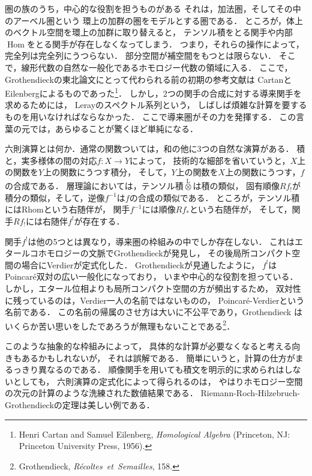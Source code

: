 \documentclass[11pt, a4paper, dvipdfmx]{jlreq}
\theoremstyle{definition}
\newcommand{\Hom}{\mathop{\mathrm{Hom}}\nolimits}
\theoremstyle{mystyle}
\numberwithin{equation}{section} %
\begin{document}
圏の族のうち，中心的な役割を担うものがある
それは，加法圏，そしてその中のアーベル圏という
環上の加群の圏をモデルとする圏である．
ところが，体上のベクトル空間を環上の加群に取り替えると，
テンソル積をとる関手や内部$\Hom$をとる関手が存在しなくなってしまう．
つまり，それらの操作によって，完全列は完全列にうつらない．
部分空間が補空間をもつとは限らない．
そこで，線形代数の自然な一般化であるホモロジー代数の領域に入る．
ここで，Grothendieckの東北論文にとって代わられる前の初期の参考文献は
CartanとEilenbergによるものであった\footnote[10]{
    Henri Cartan and Samuel Eilenberg, 
    \textit{Homological Algebra} 
    (Princeton, NJ: Princeton University Press, 1956).
}．
しかし，2つの関手の合成に対する導来関手を求めるためには，
Lerayのスペクトル系列という，
しばしば煩雑な計算を要するものを用いなければならなかった．
ここで導来圏がその力を発揮する．
この言葉の元では，あらゆることが驚くほど単純になる．

六則演算とは何か．通常の関数ついては，和の他に3つの自然な演算がある．
積と，実多様体の間の対応$f\colon X\to Y$によって，
技術的な細部を省いていうと，$X$上の関数を$Y$上の関数にうつす積分，
そして，$Y$上の関数を$X$上の関数にうつす，$f$の合成である．
層理論においては，テンソル積$\overset{\mathrm{L}}{\otimes}$は積の類似，
固有順像$Rf_!$が積分の類似，そして，逆像$f^{-1}$は$f$の合成の類似である．
ところが，テンソル積には$\mathrm{Rhom}$という右随伴が，
関手$f^{-1}$には順像$Rf_{\ast}$という右随伴が，
そして，関手$Rf_{!}$には右随伴$f^!$が存在する．

関手$f^!$は他の5つとは異なり，導来圏の枠組みの中でしか存在しない．
これはエタールコホモロジーの文脈でGrothendieckが発見し，
その後局所コンパクト空間の場合にVerdierが定式化した．
Grothendieckが見通したように，
$f^!$はPoincar\'e双対の広い一般化になっており，
いまや中心的な役割を担っている．
しかし，エタール位相よりも局所コンパクト空間の方が頻出するため，
双対性に残っているのは，Verdier一人の名前ではないものの，
Poincar\'e-Verdierという名前である．
この名前の帰属のさせ方は大いに不公平であり，Grothendieck
はいくらか苦い思いをしたであろうが無理もないことである\footnote[11]{
    Grothendieck,
    \textit{R\'ecoltes\ et\ Semailles}, 158.
}．

このような抽象的な枠組みによって，
具体的な計算が必要なくなると考える向きもあるかもしれないが，
それは誤解である．
簡単にいうと，計算の仕方がまるっきり異なるのである．
順像関手を用いても積文を明示的に求められはしないとしても，
六則演算の定式化によって得られるのは，
やはりホモロジー空間の次元の計算のような洗練された数値結果である．
Riemann-Roch-Hilzebruch-Grothendieckの定理は美しい例である．
\end{document}
